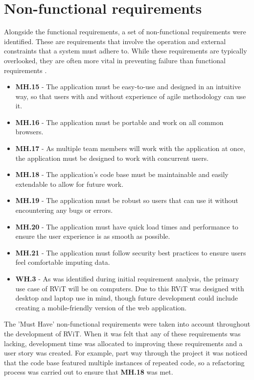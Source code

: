 \documentclass[l4proj.tex]{subfiles}
\begin{document}
\section{Non-functional requirements}
Alongside the functional requirements, a set of non-functional requirements were identified. These are requirements that involve the operation and external constraints that a system must adhere to. While these requirements are typically overlooked, they are often more vital in preventing failure than functional requirements \cite{Mairiza2010}.

\begin{itemize}
    \item \textbf{MH.15} - The application must be easy-to-use and designed in an intuitive way, so that users with and without experience of agile methodology can use it. 
    \item \textbf{MH.16} - The application must be portable and work on all common browsers.
    \item \textbf{MH.17} - As multiple team members will work with the application at once, the application must be designed to work with concurrent users.
    \item \textbf{MH.18} - The application's code base must be maintainable and easily extendable to allow for future work.
    \item \textbf{MH.19} - The application must be robust so users that can use it without encountering any bugs or errors.
    \item \textbf{MH.20} - The application must have quick load times and performance to ensure the user experience is as smooth as possible. 
    \item \textbf{MH.21} - The application must follow security best practices to ensure users feel comfortable imputing data.\\

    \item \textbf{WH.3} - As was identified during initial requirement analysis, the primary use case of RViT will be on computers. Due to this RViT was designed with desktop and laptop use in mind, though future development could include creating a mobile-friendly version of the web application.
\end{itemize}

The 'Must Have' non-functional requirements were taken into account throughout the development of RViT. When it was felt that any of these requirements was lacking, development time was allocated to improving these requirements and a user story was created. For example, part way through the project it was noticed that the code base featured multiple instances of repeated code, so a refactoring process was carried out to ensure that \textbf{MH.18} was met.
\end{document}
